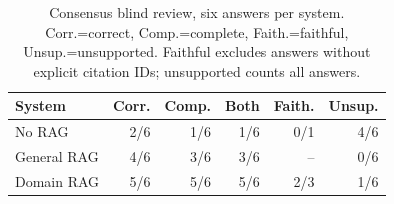 \begin{table}[t]
\centering
\small
\setlength{\tabcolsep}{3pt}
\begin{tabular}{lrrrrr}
\toprule
System & Corr. & Comp. & Both & Faith. & Unsup. \\
\midrule
No RAG & 2/6 & 1/6 & 1/6 & 0/1 & 4/6 \\
General RAG & 4/6 & 3/6 & 3/6 & -- & 0/6 \\
Domain RAG & 5/6 & 5/6 & 5/6 & 2/3 & 1/6 \\
\bottomrule
\end{tabular}
\caption{Consensus blind review, six answers per system. Corr.=correct, Comp.=complete, Faith.=faithful, Unsup.=unsupported. Faithful excludes answers without explicit citation IDs; unsupported counts all answers.}
\label{tab:blind-review}
\end{table}
